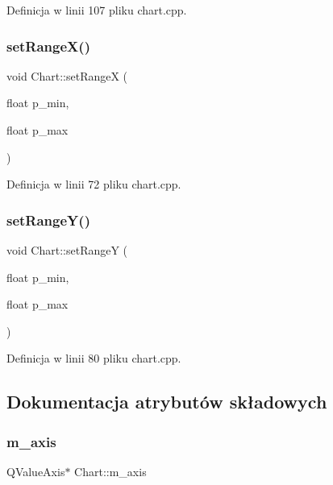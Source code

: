 Definicja w linii 107 pliku chart.\+cpp.

\mbox{\label{class_chart_ad7cb4c524b68425320c7724c6152d4fa}} 
\subsubsection{\texorpdfstring{set\+Range\+X()}{setRangeX()}}
{\footnotesize\ttfamily void Chart\+::set\+RangeX (\begin{DoxyParamCaption}\item[{float}]{p\+\_\+min,  }\item[{float}]{p\+\_\+max }\end{DoxyParamCaption})}



Definicja w linii 72 pliku chart.\+cpp.

\mbox{\label{class_chart_afa8b1c978f21659710aa09bbe4a5b828}} 
\subsubsection{\texorpdfstring{set\+Range\+Y()}{setRangeY()}}
{\footnotesize\ttfamily void Chart\+::set\+RangeY (\begin{DoxyParamCaption}\item[{float}]{p\+\_\+min,  }\item[{float}]{p\+\_\+max }\end{DoxyParamCaption})}



Definicja w linii 80 pliku chart.\+cpp.



\subsection{Dokumentacja atrybutów składowych}
\mbox{\label{class_chart_aca1b02de1a6e6f3e68bbd1a9393a30de}} 
\subsubsection{\texorpdfstring{m\+\_\+axis}{m\_axis}}
{\footnotesize\ttfamily Q\+Value\+Axis$\ast$ Chart\+::m\+\_\+axis\hspace{0.3cm}{\ttfamily [private]}}




